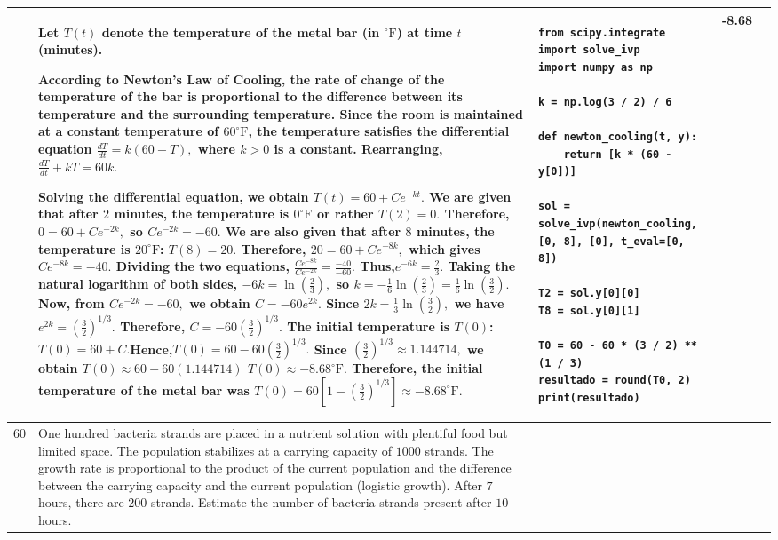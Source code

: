 \documentclass[a4paper,12pt]{article}
\begin{document}
\begin{longtable}{|p{0.3cm}|p{}|p{10cm}|p{}|p{1.5cm}|}
              &Let $T(t)$ denote the temperature of the metal bar (in ${}^\circ\mathrm{F}$) at time $t$ (minutes).

According to Newton's Law of Cooling, the rate of change of the temperature of the bar is proportional to the difference between its temperature and the surrounding temperature. Since the room is maintained at a constant temperature of $60^\circ\mathrm{F}$, the temperature satisfies the differential equation $\frac{dT}{dt}=k(60-T),$ where $k>0$ is a constant. Rearranging,
$\frac{dT}{dt}+kT=60k.$

Solving the differential equation, we obtain $T(t)=60+Ce^{-kt}.$
We are given that after $2$ minutes, the temperature is $0^\circ\mathrm{F}$ or rather $T(2)=0.$
Therefore, $0=60+Ce^{-2k},$ so
$Ce^{-2k}=-60.$  We are also given that after $8$ minutes, the temperature is $20^\circ\mathrm{F}$:
$T(8)=20.$ Therefore, $20=60+Ce^{-8k},$ which gives
$Ce^{-8k}=-40.$ Dividing the two equations, $\frac{Ce^{-8k}}{Ce^{-2k}}=\frac{-40}{-60}.$
Thus,$e^{-6k}=\frac{2}{3}.$
Taking the natural logarithm of both sides, $-6k=\ln\left(\frac{2}{3}\right),$ so $k=-\frac{1}{6}\ln\left(\frac{2}{3}\right)
=\frac{1}{6}\ln\left(\frac{3}{2}\right).$ Now, from $Ce^{-2k}=-60,$ we obtain $C=-60e^{2k}.$ Since
$2k=\frac{1}{3}\ln\left(\frac{3}{2}\right),$ we have
$e^{2k}=\left(\frac{3}{2}\right)^{1/3}.$
Therefore, $C=-60\left(\frac{3}{2}\right)^{1/3}.$
The initial temperature is $T(0)$:
$T(0)=60+C.$Hence,$T(0)=60-60\left(\frac{3}{2}\right)^{1/3}.$
Since $\left(\frac{3}{2}\right)^{1/3}\approx1.144714,$
we obtain $T(0)\approx60-60(1.144714)$ $T(0)\approx-8.68^\circ\mathrm{F}.$ Therefore, the initial temperature of the metal bar was $T(0)=60\left[1-\left(\frac{3}{2}\right)^{1/3}\right]\approx-8.68^\circ\mathrm{F}.$

 &\begin{verbatim}
from scipy.integrate import solve_ivp
import numpy as np

k = np.log(3 / 2) / 6

def newton_cooling(t, y):
    return [k * (60 - y[0])]

sol = solve_ivp(newton_cooling, [0, 8], [0], t_eval=[0, 8])

T2 = sol.y[0][0]
T8 = sol.y[0][1]

T0 = 60 - 60 * (3 / 2) ** (1 / 3)
resultado = round(T0, 2)
print(resultado)
\end{verbatim}& -8.68 \\ \hline 
 60           & One hundred bacteria strands are placed in a nutrient solution with plentiful food but limited space. The population stabilizes at a carrying capacity of $1000$ strands. The growth rate is proportional to the product of the current population and the difference between the carrying capacity and the current population (logistic growth). After $7$ hours, there are $200$ strands. Estimate the number of bacteria strands present after $10$ hours.



\end{longtable}
\end{document}
